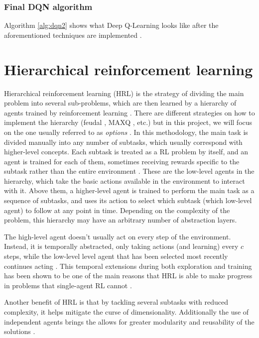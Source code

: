 \subsubsection*{Final DQN algorithm}

Algorithm \ref{alg:dqn2} shows what Deep Q-Learning looks like after the aforementioned techniques are implemented \cite{Mnih:2015}.

\section{Hierarchical reinforcement learning}

Hierarchical reinforcement learning (HRL) is the strategy of dividing the main problem into several sub-problems, which are then learned by a hierarchy of agents trained by reinforcement learning \cite{Barto:2003, Al-Emran:2015, Pateria:2021}. There are different strategies on how to implement the hierarchy (feudal \cite{Vezhnevets:2017}, MAXQ \cite{Dietterich:1999}, etc.) but in this project, we will focus on the one usually referred to as \textit{options} \cite{Sutton:2018}. In this methodology, the main task is divided manually into any number of subtasks, which usually correspond with higher-level concepts. Each subtask is treated as a RL problem by itself, and an agent is trained for each of them, sometimes receiving rewards specific to the subtask rather than the entire environment \cite{Pateria:2021}. These are the low-level agents in the hierarchy, which take the basic actions available in the environment to interact with it. Above them, a higher-level agent is trained to perform the main task as a sequence of subtasks, and uses its action to select which subtask (which low-level agent) to follow at any point in time. Depending on the complexity of the problem, this hierarchy may have an arbitrary number of abstraction layers.

The high-level agent doesn't usually act on every step of the environment. Instead, it is temporally abstracted, only taking actions (and learning) every $c$ steps, while the low-level level agent that has been selected most recently continues acting \cite{Sutton:2018}. This temporal extensions during both exploration and training has been shown to be one of the main reasons that HRL is able to make progress in problems that single-agent RL cannot \cite{Nachum:2019}.

Another benefit of HRL is that by tackling several subtasks with reduced complexity, it helps mitigate the curse of dimensionality. Additionally the use of independent agents brings the allows for greater modularity and reusability of the solutions \cite{Al-Emran:2015}.

